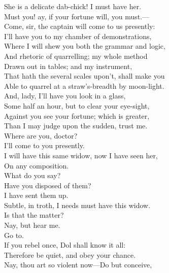 \documentclass[a4paper,oneside]{memoir}
\begin{document}
\begin{drama*}
She is a delicate dab-chick! I must have her.\\
\subtlespeaks Must you! ay, if your fortune will, you must.---\\
Come, sir, the captain will come to us presently:\\
I'll have you to my chamber of demonstrations,\\
Where I will shew you both the grammar and logic,\\
And rhetoric of quarrelling; my whole method\\
Drawn out in tables; and my instrument,\\
That hath the several scales upon't, shall make you\\
Able to quarrel at a straw's-breadth by moon-light.\\
And, lady, I'll have you look in a glass,\\
Some half an hour, but to clear your eye-sight,\\
Against you see your fortune; which is greater,\\
Than I may judge upon the sudden, trust me.\\
\facespeaks Where are you, doctor?\\
\subtlespeaks {}  I'll come to you presently.\\
\facespeaks I will have this same widow, now I have seen her,\\
On any composition.\\
\subtlespeaks {} What do you say?\\
\facespeaks Have you disposed of them?\\
\subtlespeaks {} I have sent them up.\\
\facespeaks Subtle, in troth, I needs must have this widow.\\
\subtlespeaks Is that the matter?\\
\facespeaks {} Nay, but hear me.\\
\subtlespeaks {} Go to.\\
If you rebel once, Dol shall know it all:\\
Therefore be quiet, and obey your chance.\\
\facespeaks Nay, thou art so violent now---Do but conceive,\\

\end{drama*}
\end{document}
